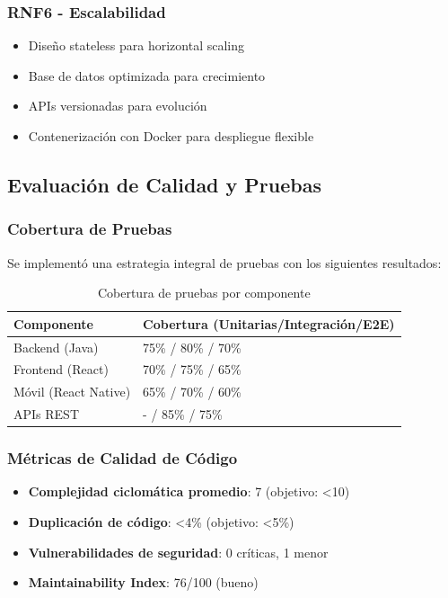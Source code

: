 \subsubsection{RNF6 - Escalabilidad}
\begin{itemize}
\item Diseño stateless para horizontal scaling
\item Base de datos optimizada para crecimiento
\item APIs versionadas para evolución
\item Contenerización con Docker para despliegue flexible
\end{itemize}

\subsection{Evaluación de Calidad y Pruebas}

\subsubsection{Cobertura de Pruebas}

Se implementó una estrategia integral de pruebas con los siguientes resultados:

\begin{table}[h]
\centering
\caption{Cobertura de pruebas por componente}
\label{tab:pruebas}
\renewcommand{\arraystretch}{1.3}
\footnotesize
\begin{tabular}{|l|p{4cm}|}
\hline
\textbf{Componente} & \textbf{Cobertura (Unitarias/Integración/E2E)} \\
\hline
Backend (Java) & 75\% / 80\% / 70\% \\
\hline
Frontend (React) & 70\% / 75\% / 65\% \\
\hline
Móvil (React Native) & 65\% / 70\% / 60\% \\
\hline
APIs REST & - / 85\% / 75\% \\
\hline
\end{tabular}
\end{table}

\subsubsection{Métricas de Calidad de Código}

\begin{itemize}
\item \textbf{Complejidad ciclomática promedio}: 7 (objetivo: <10)
\item \textbf{Duplicación de código}: <4\% (objetivo: <5\%)
\item \textbf{Vulnerabilidades de seguridad}: 0 críticas, 1 menor
\item \textbf{Maintainability Index}: 76/100 (bueno)
\end{itemize}


